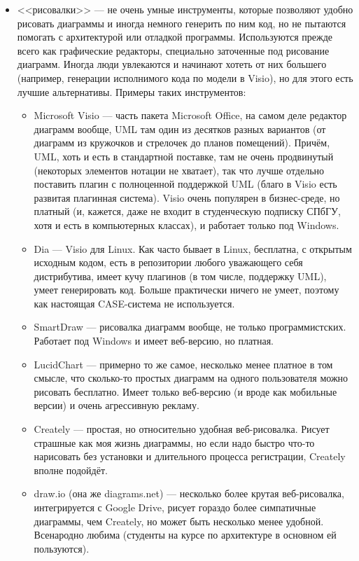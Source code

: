 \documentclass{../../text-style}
\begin{document}
\begin{itemize}
    \item <<рисовалки>> --- не очень умные инструменты, которые позволяют удобно рисовать диаграммы и иногда немного генерить по ним код, но не пытаются помогать с архитектурой или отладкой программы. Используются прежде всего как графические редакторы, специально заточенные под рисование диаграмм. Иногда люди увлекаются и начинают хотеть от них большего (например, генерации исполнимого кода по модели в Visio), но для этого есть лучшие альтернативы. Примеры таких инструментов:
    \begin{itemize}
        \item Microsoft Visio --- часть пакета Microsoft Office, на самом деле редактор диаграмм вообще, UML там один из десятков разных вариантов (от диаграмм из кружочков и стрелочек до планов помещений). Причём, UML, хоть и есть в стандартной поставке, там не очень продвинутый (некоторых элементов нотации не хватает), так что лучше отдельно поставить плагин с полноценной поддержкой UML (благо в Visio есть развитая плагинная система). Visio очень популярен в бизнес-среде, но платный (и, кажется, даже не входит в студенческую подписку СПбГУ, хотя и есть в компьютерных классах), и работает только под Windows.
        \item Dia --- Visio для Linux. Как часто бывает в Linux, бесплатна, с открытым исходным кодом, есть в репозитории любого уважающего себя дистрибутива, имеет кучу плагинов (в том числе, поддержку UML), умеет генерировать код. Больше практически ничего не умеет, поэтому как настоящая CASE-система не используется.
        \item SmartDraw --- рисовалка диаграмм вообще, не только программистских. Работает под Windows и имеет веб-версию, но платная.
        \item LucidChart --- примерно то же самое, несколько менее платное в том смысле, что сколько-то простых диаграмм на одного пользователя можно рисовать бесплатно. Имеет только веб-версию (и вроде как мобильные версии) и очень агрессивную рекламу.
        \item Creately --- простая, но относительно удобная веб-рисовалка. Рисует страшные как моя жизнь диаграммы, но если надо быстро что-то нарисовать без установки и длительного процесса регистрации, Creately вполне подойдёт.
        \item draw.io (она же diagrams.net) --- несколько более крутая веб-рисовалка, интегрируется с Google Drive, рисует гораздо более симпатичные диаграммы, чем Creately, но может быть несколько менее удобной. Всенародно любима (студенты на курсе по архитектуре в основном ей пользуются).

\end{itemize}
\end{itemize}
\end{document}
